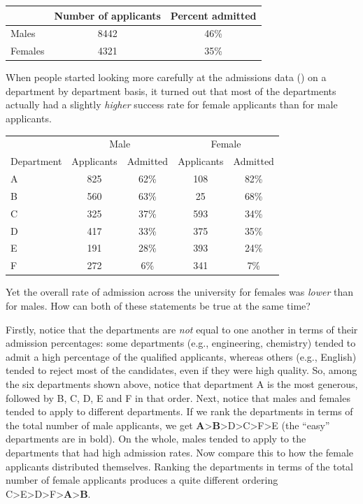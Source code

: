 \documentclass[
  11pt,
  a4paper,
  twoside,symmetric,openright]{book}
\theoremstyle{break}
\theoremstyle{break}
\begin{document}
\begin{table}[H]
\centering
\begin{tabular}{lcc}
\toprule
  & Number of applicants & Percent admitted\\
\midrule
Males & 8442 & 46\%\\
Females & 4321 & 35\%\\
\bottomrule
\end{tabular}
\end{table}

When people started looking more carefully at the admissions data () on a department by department basis, it turned out that most of the departments actually had a slightly \emph{higher} success rate for female applicants than for male applicants.

\begin{table}[H]
\centering
\begin{tabular}{lcccc}
\toprule
\multicolumn{1}{c}{ } & \multicolumn{2}{c}{Male} & \multicolumn{2}{c}{Female} \\
\cmidrule(l{3pt}r{3pt}){2-3} \cmidrule(l{3pt}r{3pt}){4-5}
Department & Applicants & Admitted & Applicants & Admitted\\
\midrule
A & 825 & 62\% & 108 & 82\%\\
B & 560 & 63\% & 25 & 68\%\\
C & 325 & 37\% & 593 & 34\%\\
D & 417 & 33\% & 375 & 35\%\\
E & 191 & 28\% & 393 & 24\%\\
F & 272 & 6\% & 341 & 7\%\\
\bottomrule
\end{tabular}
\end{table}

Yet the overall rate of admission across the university for females was \emph{lower} than for males. How can both of these statements be true at the same time?

Firstly, notice that the departments are \emph{not} equal to one another in terms of their admission percentages: some departments (e.g., engineering, chemistry) tended to admit a high percentage of the qualified applicants, whereas others (e.g., English) tended to reject most of the candidates, even if they were high quality. So, among the six departments shown above, notice that department A is the most generous, followed by B, C, D, E and F in that order. Next, notice that males and females tended to apply to different departments. If we rank the departments in terms of the total number of male applicants, we get \textbf{A}\textgreater{}\textbf{B}\textgreater D\textgreater C\textgreater F\textgreater E (the ``easy'' departments are in bold). On the whole, males tended to apply to the departments that had high admission rates. Now compare this to how the female applicants distributed themselves. Ranking the departments in terms of the total number of female applicants produces a quite different ordering C\textgreater E\textgreater D\textgreater F\textgreater{}\textbf{A}\textgreater{}\textbf{B}.
\end{document}

